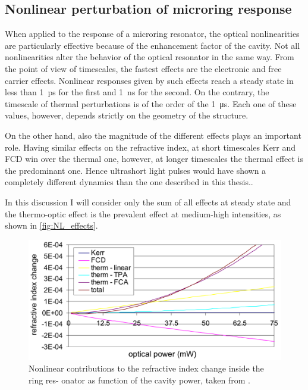 \subsection{Nonlinear perturbation of microring response}
\label{ssec:Nonlinear_perturbation_of_microring_response}
When applied to the response of a microring resonator, the optical nonlinearities are particularly effective because of the enhancement factor of the cavity.
Not all nonlinearities alter the behavior of the optical resonator in the same way.
From the point of view of timescales, the fastest effects are the electronic and free carrier effects.
Nonlinear responses given by such effects reach a steady state in less than \SI{1}{\ps} for the first and \SI{1}{\ns} for the second.
On the contrary, the timescale of thermal perturbations is of the order of the \SI{1}{\us}.
Each one of these values, however, depends strictly on the geometry of the structure.

On the other hand, also the magnitude of the different effects plays an important role.
Having similar effects on the refractive index, at short timescales Kerr and \ac{FCD} win over the thermal one, however, at longer timescales the thermal effect is the predominant one.
Hence ultrashort light pulses would have shown a completely different dynamics than the one described in this thesis..

In this discussion I will consider only the sum of all effects at steady state and the thermo-optic effect is the prevalent effect at medium-high intensities, as shown in \autoref{fig:NL_effects}.

\begin{figure}[!htbp]
	\centering
	\includegraphics[scale=.4]{figures/Baets_NL_dependence_400.png}
	\caption{Nonlinear contributions to the refractive index change inside the ring res-
onator as function of the cavity power, taken from \cite{priem2005optical}.}
	\label{fig:NL_effects}
\end{figure}

